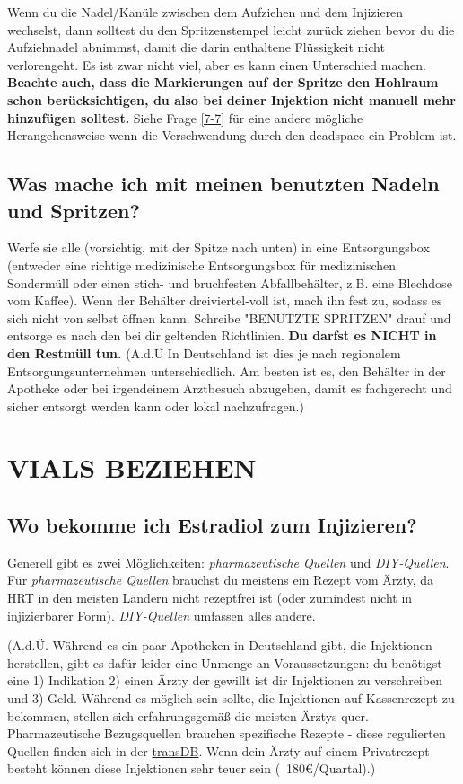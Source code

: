 \documentclass{article}
\begin{document}
Wenn du die Nadel/Kanüle zwischen dem Aufziehen und dem Injizieren wechselst, dann solltest du den Spritzenstempel leicht zurück ziehen bevor du die Aufziehnadel abnimmst, damit die darin enthaltene Flüssigkeit nicht verlorengeht. Es ist zwar nicht viel, aber es kann einen Unterschied machen. \textbf{Beachte auch, dass die Markierungen auf der Spritze den Hohlraum schon berücksichtigen, du also bei deiner Injektion nicht manuell mehr hinzufügen solltest.} Siehe Frage \ref{7-7} für eine andere mögliche Herangehensweise wenn die Verschwendung durch den deadspace ein Problem ist.

\subsection{Was mache ich mit meinen benutzten Nadeln und Spritzen?}\label{5-27}

Werfe sie alle (vorsichtig, mit der Spitze nach unten) in eine Entsorgungsbox (entweder eine richtige medizinische Entsorgungsbox für medizinischen Sondermüll oder einen stich- und bruchfesten Abfallbehälter, z.B. eine Blechdose vom Kaffee). Wenn der Behälter dreiviertel-voll ist, mach ihn fest zu, sodass es sich nicht von selbst öffnen kann. Schreibe "BENUTZTE SPRITZEN" drauf und entsorge es nach den bei dir geltenden Richtlinien. \textbf{Du darfst es NICHT in den Restmüll tun.} (A.d.Ü In Deutschland ist dies je nach regionalem Entsorgungsunternehmen unterschiedlich. Am besten ist es, den Behälter in der Apotheke oder bei irgendeinem Arztbesuch abzugeben, damit es fachgerecht und sicher entsorgt werden kann oder lokal nachzufragen.)

\section{VIALS BEZIEHEN}\label{sv}

\subsection{Wo bekomme ich Estradiol zum Injizieren?}

Generell gibt es zwei Möglichkeiten: \textit{pharmazeutische Quellen} und \textit{DIY-Quellen}. Für \textit{pharmazeutische Quellen} brauchst du meistens ein Rezept vom Ärzty, da HRT in den meisten Ländern nicht rezeptfrei ist (oder zumindest nicht in injizierbarer Form). \textit{DIY-Quellen} umfassen alles andere. 

(A.d.Ü. Während es ein paar Apotheken in Deutschland gibt, die Injektionen herstellen, gibt es dafür leider eine Unmenge an Voraussetzungen: du benötigst eine 1) Indikation 2) einen Ärzty der gewillt ist dir Injektionen zu verschreiben und 3) Geld. Während es möglich sein sollte, die Injektionen auf Kassenrezept zu bekommen, stellen sich erfahrungsgemäß die meisten Ärztys quer. Pharmazeutische Bezugsquellen brauchen spezifische Rezepte - diese regulierten Quellen finden sich in der \href{https://transdb.de/search?type=pharmacy&offers=eInjection}{trans\*DB}. Wenn dein Ärzty auf einem Privatrezept besteht können diese Injektionen sehr teuer sein (~180€/Quartal).)
\end{document}
